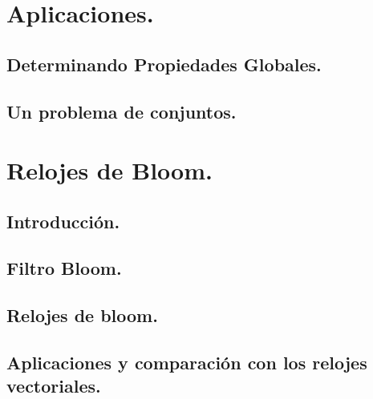 \documentclass[9pt]{beamer}
\begin{document}


\section{Aplicaciones.}
\subsection{Determinando Propiedades Globales.}
\subsection{Un problema de conjuntos.}
\section{Relojes de Bloom.}
\subsection{Introducción.}
\subsection{Filtro Bloom.}
\subsection{Relojes de bloom.}
\subsection{Aplicaciones y comparación con los relojes vectoriales.}


\end{document}
